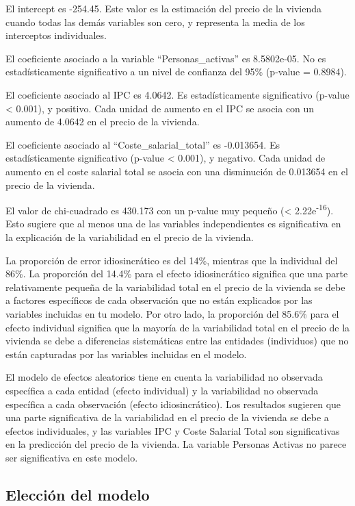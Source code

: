 \documentclass[
]{article}
\begin{document}
El intercept es -254.45. Este valor es la estimación del precio de la
vivienda cuando todas las demás variables son cero, y representa la
media de los interceptos individuales.

El coeficiente asociado a la variable ``Personas\_activas'' es
8.5802e-05. No es estadísticamente significativo a un nivel de confianza
del 95\% (p-value = 0.8984).

El coeficiente asociado al IPC es 4.0642. Es estadísticamente
significativo (p-value \textless{} 0.001), y positivo. Cada unidad de
aumento en el IPC se asocia con un aumento de 4.0642 en el precio de la
vivienda.

El coeficiente asociado al ``Coste\_salarial\_total'' es -0.013654. Es
estadísticamente significativo (p-value \textless{} 0.001), y negativo.
Cada unidad de aumento en el coste salarial total se asocia con una
disminución de 0.013654 en el precio de la vivienda.

El valor de chi-cuadrado es 430.173 con un p-value muy pequeño
(\textless{} 2.22e\textsuperscript{-16}). Esto sugiere que al menos una
de las variables independientes es significativa en la explicación de la
variabilidad en el precio de la vivienda.

La proporción de error idiosincrático es del 14\%, mientras que la
individual del 86\%. La proporción del 14.4\% para el efecto
idiosincrático significa que una parte relativamente pequeña de la
variabilidad total en el precio de la vivienda se debe a factores
específicos de cada observación que no están explicados por las
variables incluidas en tu modelo. Por otro lado, la proporción del
85.6\% para el efecto individual significa que la mayoría de la
variabilidad total en el precio de la vivienda se debe a diferencias
sistemáticas entre las entidades (individuos) que no están capturadas
por las variables incluidas en el modelo.

El modelo de efectos aleatorios tiene en cuenta la variabilidad no
observada específica a cada entidad (efecto individual) y la
variabilidad no observada específica a cada observación (efecto
idiosincrático). Los resultados sugieren que una parte significativa de
la variabilidad en el precio de la vivienda se debe a efectos
individuales, y las variables IPC y Coste Salarial Total son
significativas en la predicción del precio de la vivienda. La variable
Personas Activas no parece ser significativa en este modelo.

\hypertarget{elecciuxf3n-del-modelo}{%
\subsection{Elección del modelo}\label{elecciuxf3n-del-modelo}}
\end{document}
